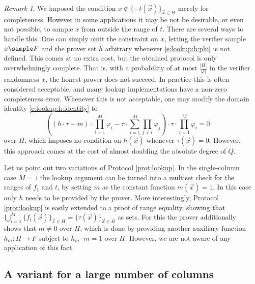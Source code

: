 \documentclass[11pt]{article}
\theoremstyle{definition}
\theoremstyle{remark}
\newtheorem{rem}[thm]{Remark}
\begin{document}
\begin{rem}
\label{rem:lookup:completeness}
We imposed the condition $x\notin \{- t(\vec x)\}_{\vec x \in H}$ merely for completeness. 
However in some applications it may be not be desirable, or even not possible, to sample $x$ from outside the range of $t$.
There are several ways to handle this.
One can simply omit the constraint on $x$, letting the verifier sample $x\sample F$ and the prover set $h$ arbitrary whenever \eqref{e:lookup:h:phi} is not defined.
This comes at no extra cost, but the obtained protocol is only overwhelmingly complete. 
That is, with a probability of at most $\frac{|H|}{|F|}$ in the verifier randomness $x$, the honest prover does not succeed.
In practice this is often considered acceptable, and many lookup implementations have a non-zero completeness error. 
Whenever this is not acceptable, one may modify the domain identity \eqref{e:lookup:h:identity} to 
\begin{equation}
\label{e:lookup:h:identity:complete}
\left((h \cdot \tau + m) \cdot \prod_{i=1}^M \varphi_i - \tau\cdot \sum_{i=1}^M \prod_{j\neq i} \varphi_j\right)\cdot \tau\cdot  \prod_{i=1}^M \varphi_i  = 0
\end{equation}
over $H$, which imposes no condition on $h(\vec x)$ whenever $\tau(\vec x)= 0$. 
However, this approach comes at the cost of almost doubling the absolute degree of $Q$.
\end{rem}

Let us point out two variations of Protocol \ref{prot:lookup}.
In the single-column case $M=1$ the lookup argument can be turned into a multiset check for the ranges of $f_1$ and $t$, by setting $m$ as the constant function $m(\vec x) = 1$.
In this case only $h$ needs to be provided by the prover.
More interestingly, Protocol \ref{prot:lookup} is easily extended to a proof of range equality, showing that $\bigcup_{i=1}^M \{f_i(\vec x)\}_{\vec x\in H} = \{\tau (\vec x)\}_{\vec x\in H}$ as sets.
For this the prover additionally shows that $m \neq 0$ over $H$, which is done by providing another auxiliary function $h_m: H\rightarrow F$ subject to $h_m\cdot m = 1$ over $H$.
However, we are not aware of any application of this fact.






\subsection{A variant for a large number of columns}
\label{s:lookup:large}
\end{document}
